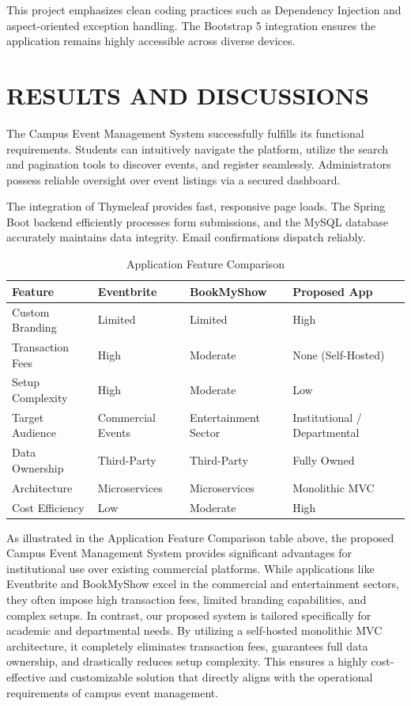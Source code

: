 \documentclass[12pt]{report}
\begin{document}
This project emphasizes clean coding practices such as Dependency Injection and aspect-oriented exception handling. The Bootstrap 5 integration ensures the application remains highly accessible across diverse devices. 

\chapter{RESULTS AND DISCUSSIONS} 
\linespread{1.5} 
The Campus Event Management System successfully fulfills its functional requirements. Students can intuitively navigate the platform, utilize the search and pagination tools to discover events, and register seamlessly. Administrators possess reliable oversight over event listings via a secured dashboard. 

The integration of Thymeleaf provides fast, responsive page loads. The Spring Boot backend efficiently processes form submissions, and the MySQL database accurately maintains data integrity. Email confirmations dispatch reliably. \\

\begin{table}[H]
\centering
\small
\renewcommand{\arraystretch}{1.3}
\begin{tabular}{|p{3.5cm}|p{3cm}|p{3cm}|p{3cm}|}
\hline
\textbf{Feature} & \textbf{Eventbrite} & \textbf{BookMyShow} & \textbf{Proposed App} \\
\hline
Custom Branding & Limited & Limited & High \\
\hline
Transaction Fees & High & Moderate & None (Self-Hosted) \\
\hline
Setup Complexity & High & Moderate & Low \\
\hline
Target Audience & Commercial Events & Entertainment Sector & Institutional / Departmental \\
\hline
Data Ownership & Third-Party & Third-Party & Fully Owned \\
\hline
Architecture & Microservices & Microservices & Monolithic MVC \\
\hline
Cost Efficiency & Low & Moderate & High \\
\hline
\end{tabular}
\caption{Application Feature Comparison}
\end{table}

\vspace{0.5cm}
\noindent As illustrated in the Application Feature Comparison table above, the proposed Campus Event Management System provides significant advantages for institutional use over existing commercial platforms. While applications like Eventbrite and BookMyShow excel in the commercial and entertainment sectors, they often impose high transaction fees, limited branding capabilities, and complex setups. In contrast, our proposed system is tailored specifically for academic and departmental needs. By utilizing a self-hosted monolithic MVC architecture, it completely eliminates transaction fees, guarantees full data ownership, and drastically reduces setup complexity. This ensures a highly cost-effective and customizable solution that directly aligns with the operational requirements of campus event management.
\vspace{0.5cm}
\end{document}

